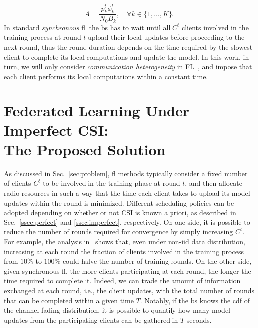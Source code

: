 \documentclass[10pt, conference, letterpaper]{IEEEtran}
\begin{document}
	\begin{equation}
		A= \frac{p_k^t \phi_k^t}{N_0 B_k}, \quad \forall k \in \{1, \dots, K\}.
	\end{equation}
	In standard \emph{synchronous} \gls{fl}, the \gls{bs} has to wait until all $C^t$ clients involved in the training process at round $t$ upload their local updates before proceeding to the next round, thus the round duration depends on the time required by the slowest client to complete its local computations and update the model. 
	In this work, in turn, we will only consider \emph{communication heterogeneity} in FL~\cite{hosseinalipour2020federated}, and impose that each client performs its local computations within a constant time. 
	
	\section{Federated Learning Under Imperfect CSI: \\The Proposed Solution}
	\label{sec:motivation}
	As discussed in Sec.~\ref{sec:problem}, \gls{fl} methods typically consider a fixed number of clients $C^t$ to be involved in the training phase at round $t$, and then allocate radio resources in such a way that the time each client takes to upload its model updates within the round is minimized. 
	Different scheduling policies can be adopted depending on whether or not CSI is known a priori, as described in Sec.~\ref{ssec:perfect} and \ref{ssec:imperfect}, respectively.
	On one side, it is possible to reduce the number of rounds required for convergence by simply increasing $C^t$. For example, the analysis in~\cite{BrendanMcMahan2017} shows that, even under non-iid data distribution, increasing at each round the fraction of clients involved in the training process from $10\%$ to $100\%$ could halve the number of training rounds.
	On the other side, given synchronous \gls{fl}, the more clients participating at each round, the longer the time required to complete it.
	Indeed, we can trade the amount of information exchanged at each round, i.e., the client updates, with the total number of rounds that can be completed within a given time  $T$. Notably, if the \gls{bs} knows the \gls{cdf} of the channel fading distribution, it is possible to quantify how many model updates from the participating clients can be gathered in $T$ seconds. 
	
\end{document}
